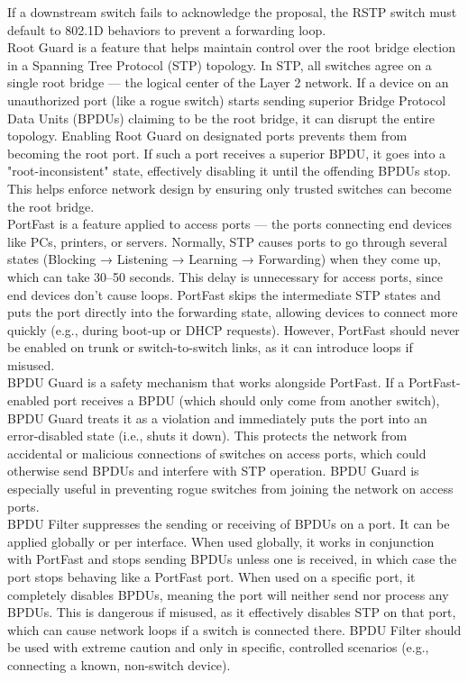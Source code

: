 \documentclass{article}
\begin{document}
If a downstream switch fails to acknowledge the proposal, the RSTP switch must default to 802.1D behaviors to prevent a forwarding loop.\\

Root Guard is a feature that helps maintain control over the root bridge election in a Spanning Tree Protocol (STP) topology. In STP, all switches agree on a single root bridge — the logical center of the Layer 2 network. If a device on an unauthorized port (like a rogue switch) starts sending superior Bridge Protocol Data Units (BPDUs) claiming to be the root bridge, it can disrupt the entire topology. Enabling Root Guard on designated ports prevents them from becoming the root port. If such a port receives a superior BPDU, it goes into a "root-inconsistent" state, effectively disabling it until the offending BPDUs stop. This helps enforce network design by ensuring only trusted switches can become the root bridge.\\

PortFast is a feature applied to access ports — the ports connecting end devices like PCs, printers, or servers. Normally, STP causes ports to go through several states (Blocking → Listening → Learning → Forwarding) when they come up, which can take 30–50 seconds. This delay is unnecessary for access ports, since end devices don’t cause loops. PortFast skips the intermediate STP states and puts the port directly into the forwarding state, allowing devices to connect more quickly (e.g., during boot-up or DHCP requests). However, PortFast should never be enabled on trunk or switch-to-switch links, as it can introduce loops if misused.\\

BPDU Guard is a safety mechanism that works alongside PortFast. If a PortFast-enabled port receives a BPDU (which should only come from another switch), BPDU Guard treats it as a violation and immediately puts the port into an error-disabled state (i.e., shuts it down). This protects the network from accidental or malicious connections of switches on access ports, which could otherwise send BPDUs and interfere with STP operation. BPDU Guard is especially useful in preventing rogue switches from joining the network on access ports.\\

BPDU Filter suppresses the sending or receiving of BPDUs on a port. It can be applied globally or per interface. When used globally, it works in conjunction with PortFast and stops sending BPDUs unless one is received, in which case the port stops behaving like a PortFast port. When used on a specific port, it completely disables BPDUs, meaning the port will neither send nor process any BPDUs. This is dangerous if misused, as it effectively disables STP on that port, which can cause network loops if a switch is connected there. BPDU Filter should be used with extreme caution and only in specific, controlled scenarios (e.g., connecting a known, non-switch device).\\
\end{document}
